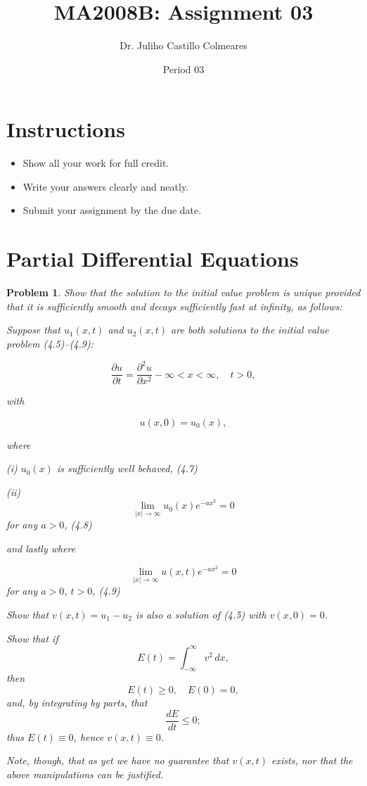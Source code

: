 \documentclass[12pt]{article}
\title{MA2008B: Assignment 03}
\author{Dr. Juliho Castillo Colmeares}
\date{Period 03}
\newtheorem{problem}{Problem}[section]
\begin{document}
\maketitle

\section*{Instructions}
\begin{itemize}
    \item Show all your work for full credit.
    \item Write your answers clearly and neatly.
    \item Submit your assignment by the due date.
\end{itemize}

\section{Partial Differential Equations}

\begin{problem}
Show that the solution to the initial value problem is unique 
provided that it is sufficiently smooth and decays sufficiently 
fast at infinity, as follows:

Suppose that $u_1(x, t)$ and $u_2(x, t)$ are both solutions to the 
initial value problem (4.5)--(4.9): 

\[\frac{\partial u}{\partial t} = \frac{\partial^2 u}{\partial x^2} - \infty < x < \infty, \quad t > 0, \tag{4.5}\]

with

\[u(x, 0) = u_0(x), \tag{4.6}\]

where

(i) \( u_0(x) \) is sufficiently well behaved, \hspace{20pt} (4.7)

(ii) \[ \lim_{|x|\to\infty} u_0(x)e^{-ax^2} = 0 \] for any \( a > 0 \), \hspace{20pt} (4.8)

and lastly where

\[ \lim_{|x|\to\infty} u(x,t)e^{-ax^2} = 0 \] for any \( a > 0 \), \( t > 0 \), \hspace{20pt} (4.9)

Show that $v(x, t) = u_1 - u_2$ 
is also a solution of (4.5) with $v(x, 0) = 0$. 

Show that if
\[
E(t) = \int_{-\infty}^\infty v^2 \, dx,
\]
then
\[
E(t) \geq 0, \quad E(0) = 0,
\]
and, by integrating by parts, that
\[
\frac{dE}{dt} \leq 0;
\]
thus $E(t) \equiv 0$, hence $v(x, t) \equiv 0$.

Note, though, that as yet we have no guarantee that $v(x, t)$ exists, 
nor that the above manipulations can be justified.
\end{problem}
\end{document}
